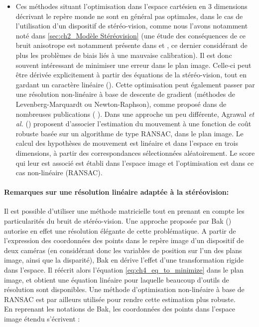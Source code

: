 \begin{itemize}
	\item{} Ces méthodes situant l'optimisation dans l'espace cartésien en 3 dimensions décrivant le repère \og monde\fg{} ne sont en général pas optimales, dans le cas de l'utilisation d'un dispositif de stéréo-vision, comme nous l'avons notamment noté dans \ref{sec:ch2_Modèle Stéréovision} (une étude des conséquences de ce bruit anisotrope est notamment présente dans \cite{Blostein1987} et \cite{Sibley2007}, ce dernier considérant de plus les problèmes de biais liés à une mauvaise calibration). Il est donc souvent intéressant de minimiser une erreur dans le plan image. Celle-ci peut être dérivée explicitement à partir des équations de la stéréo-vision, tout en gardant un caractère linéaire (\cite{Demirdjian2001,Bak2011}). Cette optimisation peut également passer par une résolution non-linéaire à base de descente de gradient (méthodes de Levenberg-Marquardt ou Newton-Raphson), comme proposé dans de nombreuses publications ( \cite{Nister2006, Comport2010, Mei, Comport2010, Zou}). Dans une approche un peu différente, Agrawal\textit{ et al.} (\cite{Agrawal2007}) proposent d'associer l'estimation du mouvement à une fonction de coût robuste basée sur un algorithme de type RANSAC, dans le plan image. Le calcul des hypothèses de mouvement est linéaire et dans l'espace en trois dimensions, à partir des correspondances sélectionnées aléatoirement. Le score qui leur est associé est établi dans l'espace image et l'optimisation est dans ce cas non-linéaire (RANSAC).\\
\end{itemize}

\paragraph{Remarques sur une résolution linéaire adaptée à la stéréovision:\\} \label{ch4:méthode_bak}
Il est possible d'utiliser une méthode matricielle tout en prenant en compte les particularités du bruit de stéréo-vision. Une approche proposée par Bak (\cite{Bak2011}) autorise en effet une résolution élégante de cette problématique. A partir de l'expression des coordonnées des points dans le repère image d'un dispositif de deux caméras (en considérant donc les variables de position sur l'un des plans image, ainsi que la disparité), Bak en dérive l'effet d'une transformation rigide dans l'espace. Il réécrit alors l'équation \ref{eq:ch4_eq_to_minimize} dans le plan image, et obtient une équation linéaire pour laquelle beaucoup d'outils de résolution sont disponibles. Une méthode d'optimisation non-linéaire à base de RANSAC est par ailleurs utilisée pour rendre cette estimation plus robuste. \\
En reprenant les notations de Bak, les coordonnées des points dans l'espace image étendu s'écrivent :

